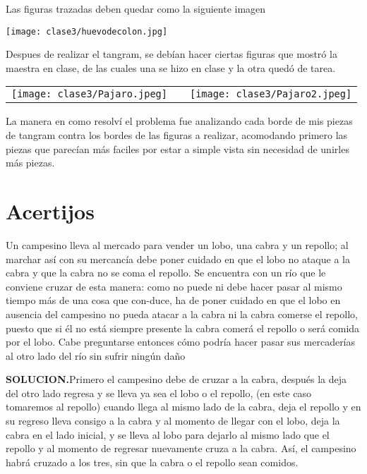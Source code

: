 Las figuras trazadas deben quedar como la siguiente imagen
\begin{center}
   \texttt{[image: clase3/huevodecolon.jpg]}
\end{center}

Despues de realizar el tangram, se debían hacer ciertas figuras que mostró la maestra en clase, de las cuales una se hizo en clase y la otra quedó de tarea.

\begin{center}
   \begin{tabular}{ccc}
      \texttt{[image: clase3/Pajaro.jpeg]}&&\texttt{[image: clase3/Pajaro2.jpeg]}
   \end{tabular}
\end{center}

La manera en como resolví el problema fue analizando cada borde de mis piezas de tangram contra los bordes de las figuras a realizar, acomodando primero las piezas que parecían más faciles por estar a simple vista sin necesidad de unirles más piezas.

\section{Acertijos}\label{sec:C3ACERTIJOS}

\begin{ejem}\label{ejem:c3P1}
   Un campesino lleva al mercado para vender un lobo, una cabra y un repollo; al marchar así con su mercancía debe poner cuidado en que el lobo no ataque a la cabra y que la cabra no se coma el repollo.
   Se encuentra con un río que le conviene cruzar de esta manera: como no puede ni debe hacer pasar al mismo tiempo más de una cosa que con-duce, ha de poner cuidado en que el lobo en ausencia del campesino no pueda atacar a la cabra ni la cabra comerse el repollo, puesto que si él no está siempre presente la cabra comerá el repollo o será comida por el lobo. Cabe preguntarse entonces cómo podría hacer pasar sus mercaderías al otro lado del río sin sufrir ningún daño
\end{ejem}
   \textbf{SOLUCION.}Primero el campesino debe de cruzar a la cabra, después la deja del otro lado regresa y se lleva ya sea el lobo o el repollo, (en este caso tomaremos al repollo) cuando llega al mismo lado de la cabra, deja el repollo y en su regreso lleva consigo a la cabra y al momento de llegar con el lobo, deja la cabra en el lado inicial,  y se lleva al lobo para dejarlo al mismo lado que el repollo y al momento de regresar nuevamente cruza a la cabra. Así, el campesino habrá cruzado a los tres, sin que la cabra o el repollo sean comidos.


